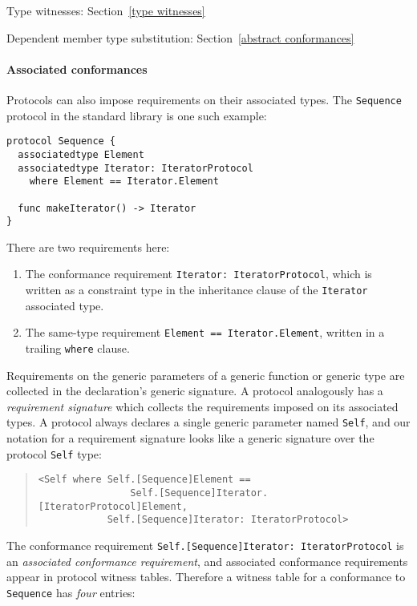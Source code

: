 \documentclass[a4paper,headsepline,bibliography=totoc,toc=flat,fleqn,twoside=semi]{scrbook}
\theoremstyle{definition}
\theoremstyle{definition}
\theoremstyle{definition}
\begin{document}
\begin{MoreDetails}
\item Type witnesses: Section~\ref{type witnesses}
\item Dependent member type substitution: Section~\ref{abstract conformances}
\end{MoreDetails}

\paragraph{Associated conformances} Protocols can also impose requirements on their associated types. The \texttt{Sequence} protocol in the standard library is one such example:
\begin{Verbatim}
protocol Sequence {
  associatedtype Element
  associatedtype Iterator: IteratorProtocol
    where Element == Iterator.Element

  func makeIterator() -> Iterator
}
\end{Verbatim}
There are two requirements here:
\begin{enumerate}
\item The conformance requirement \verb|Iterator: IteratorProtocol|, which is written as a constraint type in the inheritance clause of the \texttt{Iterator} associated type.
\item The same-type requirement \verb|Element == Iterator.Element|, written in a trailing \texttt{where} clause.
\end{enumerate}
Requirements on the generic parameters of a generic function or generic type are collected in the declaration's generic signature. A protocol analogously has a \emph{requirement signature} which collects the requirements imposed on its associated types. A protocol always declares a single generic parameter named \texttt{Self}, and our notation for a requirement signature looks like a generic signature over the protocol \texttt{Self} type:
\begin{quote}
\begin{verbatim}
<Self where Self.[Sequence]Element ==
                Self.[Sequence]Iterator.[IteratorProtocol]Element,
            Self.[Sequence]Iterator: IteratorProtocol>
\end{verbatim}
\end{quote}
The conformance requirement \verb|Self.[Sequence]Iterator: IteratorProtocol| is an \emph{associated conformance requirement}, and associated conformance requirements appear in protocol witness tables. Therefore a witness table for a conformance to \texttt{Sequence} has \emph{four} entries:
\end{document}
